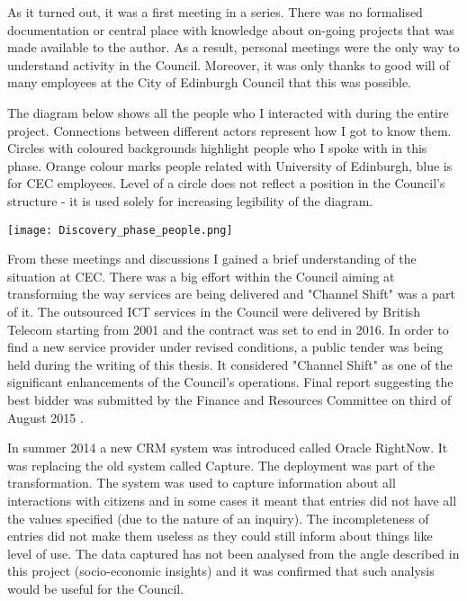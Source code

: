 As it turned out, it was a first meeting in a series. There was no formalised documentation or central place with knowledge about on-going projects that was made available to the author. As a result, personal meetings were the only way to understand activity in the Council. Moreover, it was only thanks to good will of many employees at the City of Edinburgh Council that this was possible.

The diagram below shows all the people who I interacted with during the entire project. Connections between different actors represent how I got to know them. Circles with coloured backgrounds highlight people who I spoke with in this phase. Orange colour marks people related with University of Edinburgh, blue is for CEC employees. Level of a circle does not reflect a position in the Council's structure - it is used solely for increasing legibility of the diagram.

\begin{center}
  \texttt{[image: Discovery\_phase\_people.png]}
  \label{normal_case}
\end{center}


From these meetings and discussions I gained a brief understanding of the situation at CEC. There was a big effort within the Council aiming at transforming the way services are being delivered and "Channel Shift" was a part of it. The outsourced ICT services in the Council were delivered by British Telecom starting from 2001 and the contract was set to end in 2016. In order to find a new service provider under revised conditions, a public tender was being held during the writing of this thesis. It considered "Channel Shift" as one of the significant enhancements of the Council's operations. Final report suggesting the best bidder was submitted by the Finance and Resources Committee on third of August 2015 \citep{FinanceandResourcesCommittee2016}.

In summer 2014 a new CRM system was introduced called Oracle RightNow. It was replacing the old system called Capture. The deployment was part of the transformation. The system was used to capture information about all interactions with citizens and in some cases it meant that entries did not have all the values specified (due to the nature of an inquiry). The incompleteness of entries did not make them useless as they could still inform about things like level of use. The data captured has not been analysed from the angle described in this project (socio-economic insights) and it was confirmed that such analysis would be useful for the Council.

